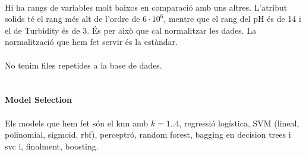 \documentclass{article}
\begin{document}
	\\
	Hi ha rangs de variables molt baixos en comparació amb uns altres. L'atribut solids té el rang més alt de l'ordre de $6\cdot10^6$, mentre que el rang del pH és de 14 i el de Turbidity és de 3. És per això que cal normalitzar les dades. La normalització que hem fet servir és la estàndar.\\
	\\
	No tenim files repetides a la base de dades.\\
	\\
	\\
	\textbf{Model Selection}\\
	\\	
	Els models que hem fet són el knn amb $k=1..4$, regressió logística, SVM (lineal, polinomial, sigmoid, rbf), perceptró, random forest, bagging en decision trees i svc i, finalment, boosting.\\
\end{document}
